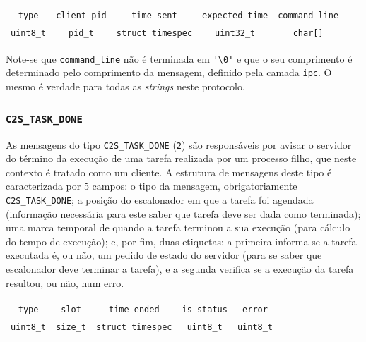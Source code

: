 \documentclass[11pt]{article}
\begin{document}
\begin{center}
    \begin{tabular}{|c|c|c|c|c|}
        \hline
            \texttt{type}           &
            \texttt{client\_pid}    &
            \texttt{time\_sent}     &
            \texttt{expected\_time} &
            \texttt{command\_line}  \\

            \texttt{uint8\_t}        &
            \texttt{pid\_t}          &
            \texttt{struct timespec} &
            \texttt{uint32\_t}       &
            \texttt{char[]}          \\
        \hline
    \end{tabular}
\end{center}

Note-se que \texttt{command\_line} não é terminada em \verb$'\0'$ e que o seu comprimento é
determinado pelo comprimento da mensagem, definido pela camada \texttt{ipc}. O mesmo é verdade para
todas as \emph{strings} neste protocolo.

\subsubsection{\texttt{C2S\_TASK\_DONE}}

As mensagens do tipo \texttt{C2S\_TASK\_DONE} (\texttt{2}) são responsáveis por avisar o servidor do
término da execução de uma tarefa realizada por um processo filho, que neste contexto é tratado como
um cliente. A estrutura de mensagens deste tipo é caracterizada por 5 campos: o tipo da mensagem,
obrigatoriamente \texttt{C2S\_TASK\_DONE}; a posição do escalonador em que a tarefa foi agendada
(informação necessária para este saber que tarefa deve ser dada como terminada); uma marca temporal
de quando a tarefa terminou a sua execução (para cálculo do tempo de execução); e, por fim, duas
etiquetas: a primeira informa se a tarefa executada é, ou não, um pedido de estado do servidor (para
se saber que escalonador deve terminar a tarefa), e a segunda verifica se a execução da tarefa
resultou, ou não, num erro.

\begin{center}
    \begin{tabular}{|c|c|c|c|c|}
        \hline
            \texttt{type}        &
            \texttt{slot}        &
            \texttt{time\_ended} &
            \texttt{is\_status}  &
            \texttt{error}       \\

            \texttt{uint8\_t}        &
            \texttt{size\_t}         &
            \texttt{struct timespec} &
            \texttt{uint8\_t}        &
            \texttt{uint8\_t}        \\
        \hline
    \end{tabular}
\end{center}
\end{document}
